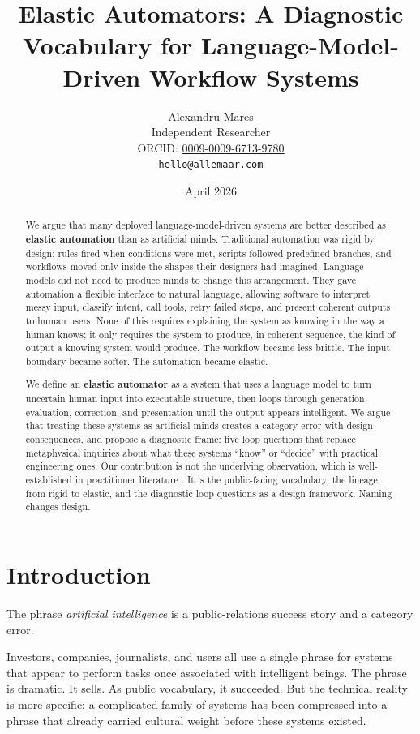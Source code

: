 \documentclass[11pt,a4paper]{article}
\title{Elastic Automators: A Diagnostic Vocabulary for Language-Model-Driven Workflow Systems}
\author{
  Alexandru Mares \\
  Independent Researcher \\
  ORCID: \href{https://orcid.org/0009-0009-6713-9780}{0009-0009-6713-9780} \\
  \texttt{hello@allemaar.com}
}
\date{April 2026}
\begin{document}
\maketitle

\begin{abstract}
We argue that many deployed language-model-driven systems are better described as \textbf{elastic automation} than as artificial minds. Traditional automation was rigid by design: rules fired when conditions were met, scripts followed predefined branches, and workflows moved only inside the shapes their designers had imagined. Language models did not need to produce minds to change this arrangement. They gave automation a flexible interface to natural language, allowing software to interpret messy input, classify intent, call tools, retry failed steps, and present coherent outputs to human users. None of this requires explaining the system as knowing in the way a human knows; it only requires the system to produce, in coherent sequence, the kind of output a knowing system would produce. The workflow became less brittle. The input boundary became softer. The automation became elastic.

We define an \textbf{elastic automator} as a system that uses a language model to turn uncertain human input into executable structure, then loops through generation, evaluation, correction, and presentation until the output appears intelligent. We argue that treating these systems as artificial minds creates a category error with design consequences, and propose a diagnostic frame: five loop questions that replace metaphysical inquiries about what these systems ``know'' or ``decide'' with practical engineering ones. Our contribution is not the underlying observation, which is well-established in practitioner literature \citep{anthropic2024agents,zaharia2024compound}. It is the public-facing vocabulary, the lineage from rigid to elastic, and the diagnostic loop questions as a design framework. Naming changes design.
\end{abstract}

\section{Introduction}

The phrase \textit{artificial intelligence} is a public-relations success story and a category error.

Investors, companies, journalists, and users all use a single phrase for systems that appear to perform tasks once associated with intelligent beings. The phrase is dramatic. It sells. As public vocabulary, it succeeded. But the technical reality is more specific: a complicated family of systems has been compressed into a phrase that already carried cultural weight before these systems existed.
\end{document}

